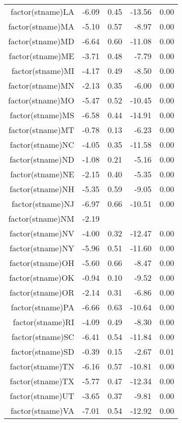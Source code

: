 \begin{table}[ht]
\begin{tabular}{rrrrr}
  factor(stname)LA & -6.09 & 0.45 & -13.56 & 0.00 \\ 
  factor(stname)MA & -5.10 & 0.57 & -8.97 & 0.00 \\ 
  factor(stname)MD & -6.64 & 0.60 & -11.08 & 0.00 \\ 
  factor(stname)ME & -3.71 & 0.48 & -7.79 & 0.00 \\ 
  factor(stname)MI & -4.17 & 0.49 & -8.50 & 0.00 \\ 
  factor(stname)MN & -2.13 & 0.35 & -6.00 & 0.00 \\ 
  factor(stname)MO & -5.47 & 0.52 & -10.45 & 0.00 \\ 
  factor(stname)MS & -6.58 & 0.44 & -14.91 & 0.00 \\ 
  factor(stname)MT & -0.78 & 0.13 & -6.23 & 0.00 \\ 
  factor(stname)NC & -4.05 & 0.35 & -11.58 & 0.00 \\ 
  factor(stname)ND & -1.08 & 0.21 & -5.16 & 0.00 \\ 
  factor(stname)NE & -2.15 & 0.40 & -5.35 & 0.00 \\ 
  factor(stname)NH & -5.35 & 0.59 & -9.05 & 0.00 \\ 
  factor(stname)NJ & -6.97 & 0.66 & -10.51 & 0.00 \\ 
  factor(stname)NM & -2.19 &  &  &  \\ 
  factor(stname)NV & -4.00 & 0.32 & -12.47 & 0.00 \\ 
  factor(stname)NY & -5.96 & 0.51 & -11.60 & 0.00 \\ 
  factor(stname)OH & -5.60 & 0.66 & -8.47 & 0.00 \\ 
  factor(stname)OK & -0.94 & 0.10 & -9.52 & 0.00 \\ 
  factor(stname)OR & -2.14 & 0.31 & -6.86 & 0.00 \\ 
  factor(stname)PA & -6.66 & 0.63 & -10.64 & 0.00 \\ 
  factor(stname)RI & -4.09 & 0.49 & -8.30 & 0.00 \\ 
  factor(stname)SC & -6.41 & 0.54 & -11.84 & 0.00 \\ 
  factor(stname)SD & -0.39 & 0.15 & -2.67 & 0.01 \\ 
  factor(stname)TN & -6.16 & 0.57 & -10.81 & 0.00 \\ 
  factor(stname)TX & -5.77 & 0.47 & -12.34 & 0.00 \\ 
  factor(stname)UT & -3.65 & 0.37 & -9.81 & 0.00 \\ 
  factor(stname)VA & -7.01 & 0.54 & -12.92 & 0.00 \\ 

\end{tabular}
\end{table}

